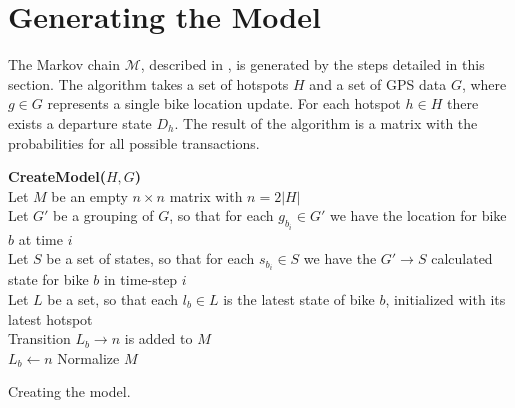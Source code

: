 \section{Generating the Model}\label{sec:generatemarkov}
The Markov chain $\mathcal{M}$, described in , is generated by the steps detailed in this section.
The algorithm takes a set of hotspots $H$ and a set of GPS data $G$, where $g \in G$ represents a single bike location update. For each hotspot $h \in H$ there exists a departure state $D_h$.
The result of the algorithm is a matrix with the probabilities for all possible transactions.

\begin{algorithm}[H]
\SetAlgoNoEnd
\textbf{CreateModel($H, G$)} \\
Let $M$ be an empty $n \times n$ matrix with $n = 2|H|$ \\
Let $G'$ be a grouping of $G$, so that for each $g_{b_i} \in G'$ we have the location for bike $b$ at time $i$\\
Let $S$ be a set of states, so that for each $s_{b_i} \in S$ we have the $G' \rightarrow S$ calculated state for bike $b$ in time-step $i$\\
Let $L$ be a set, so that each $l_b \in L$ is the latest state of bike $b$, initialized with its latest hotspot\\
    {
    Transition $L_b \rightarrow n$ is added to $M$\\
     $L_b \leftarrow n$}
Normalize $M$\\
\caption{Creating the model.}
\label{markov:create_model}
\end{algorithm}